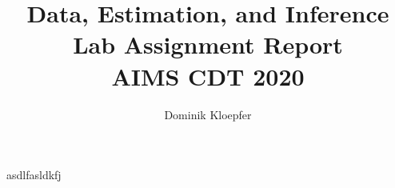 \documentclass{article}
\title{Data, Estimation, and Inference Lab Assignment Report \\
        \large{AIMS CDT 2020}}
\author{Dominik Kloepfer}
\begin{document}
    \maketitle

    asdlfasldkfj
\end{document}
